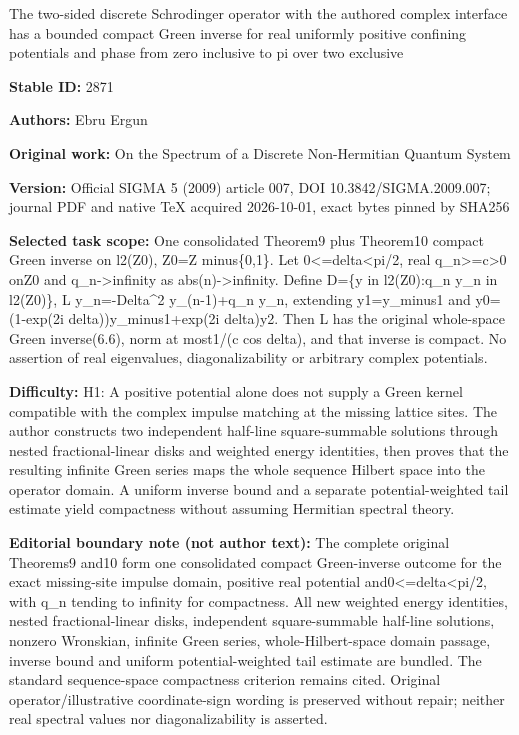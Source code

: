 \documentclass[11pt]{article}
\numberwithin{equation}{section}
\begin{document}
\begin{center}\Large The two-sided discrete Schrodinger operator with the authored complex interface has a bounded compact Green inverse for real uniformly positive confining potentials and phase from zero inclusive to pi over two exclusive\end{center}
\noindent\textbf{Stable ID:} 2871\par
\noindent\textbf{Authors:} Ebru Ergun\par
\noindent\textbf{Original work:} On the Spectrum of a Discrete Non-Hermitian Quantum System\par
\noindent\textbf{Version:} Official SIGMA 5 (2009) article 007, DOI 10.3842/SIGMA.2009.007; journal PDF and native TeX acquired 2026-10-01, exact bytes pinned by SHA256\par
\noindent\textbf{Selected task scope:} One consolidated Theorem9 plus Theorem10 compact Green inverse on l2(Z0), Z0=\allowbreak{}Z minus\{0,1\}. Let 0<=\allowbreak{}delta<pi/2, real q\_n>=\allowbreak{}c>0 onZ0 and q\_n->infinity as abs(n)->infinity. Define D=\allowbreak{}\{y in l2(Z0):q\_n y\_n in l2(Z0)\}, L y\_n=\allowbreak{}-Delta\textasciicircum{}2 y\_(n-1)+\allowbreak{}q\_n y\_n, extending y1=\allowbreak{}y\_minus1 and y0=\allowbreak{}(1-exp(2i delta))y\_minus1+\allowbreak{}exp(2i delta)y2. Then L has the original whole-space Green inverse(6.6), norm at most1/(c cos delta), and that inverse is compact. No assertion of real eigenvalues, diagonalizability or arbitrary complex potentials.\par
\noindent\textbf{Difficulty:} H1: A positive potential alone does not supply a Green kernel compatible with the complex impulse matching at the missing lattice sites. The author constructs two independent half-line square-summable solutions through nested fractional-linear disks and weighted energy identities, then proves that the resulting infinite Green series maps the whole sequence Hilbert space into the operator domain. A uniform inverse bound and a separate potential-weighted tail estimate yield compactness without assuming Hermitian spectral theory.\par
\noindent\textbf{Editorial boundary note (not author text):} The complete original Theorems9 and10 form one consolidated compact Green-inverse outcome for the exact missing-site impulse domain, positive real potential and0<=\allowbreak{}delta<pi/2, with q\_n tending to infinity for compactness. All new weighted energy identities, nested fractional-linear disks, independent square-summable half-line solutions, nonzero Wronskian, infinite Green series, whole-Hilbert-space domain passage, inverse bound and uniform potential-weighted tail estimate are bundled. The standard sequence-space compactness criterion remains cited. Original operator/illustrative coordinate-sign wording is preserved without repair; neither real spectral values nor diagonalizability is asserted.\par
\end{document}
